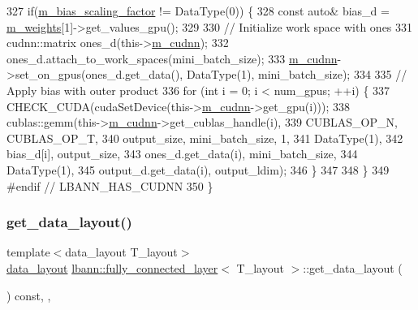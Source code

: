 \begin{DoxyCode}
327     \textcolor{keywordflow}{if}(\hyperlink{classlbann_1_1fully__connected__layer_ae02eaffd5528bf572883f8b06d1b40c0}{m\_bias\_scaling\_factor} != DataType(0)) \{
328       \textcolor{keyword}{const} \textcolor{keyword}{auto}& bias\_d = \hyperlink{classlbann_1_1Layer_a7954e30fbf9100a6ba4b56d02767a469}{m\_weights}[1]->get\_values\_gpu();
329       
330       \textcolor{comment}{// Initialize work space with ones}
331       cudnn::matrix ones\_d(this->\hyperlink{classlbann_1_1Layer_a08dbb94239e3b8c96329786c57c72e21}{m\_cudnn});
332       ones\_d.attach\_to\_work\_spaces(mini\_batch\_size);
333       \hyperlink{classlbann_1_1Layer_a08dbb94239e3b8c96329786c57c72e21}{m\_cudnn}->set\_on\_gpus(ones\_d.get\_data(), DataType(1), mini\_batch\_size);
334 
335       \textcolor{comment}{// Apply bias with outer product}
336       \textcolor{keywordflow}{for} (\textcolor{keywordtype}{int} i = 0; i < num\_gpus; ++i) \{
337         CHECK\_CUDA(cudaSetDevice(this->\hyperlink{classlbann_1_1Layer_a08dbb94239e3b8c96329786c57c72e21}{m\_cudnn}->get\_gpu(i)));
338         cublas::gemm(this->\hyperlink{classlbann_1_1Layer_a08dbb94239e3b8c96329786c57c72e21}{m\_cudnn}->get\_cublas\_handle(i),
339                      CUBLAS\_OP\_N, CUBLAS\_OP\_T,
340                      output\_size, mini\_batch\_size, 1,
341                      DataType(1),
342                      bias\_d[i], output\_size,
343                      ones\_d.get\_data(i), mini\_batch\_size,
344                      DataType(1),
345                      output\_d.get\_data(i), output\_ldim);
346       \}
347 
348     \}
349 \textcolor{preprocessor}{#endif // LBANN\_HAS\_CUDNN}
350   \}
\end{DoxyCode}
\mbox{\label{classlbann_1_1fully__connected__layer_a0d84bbfa7df80e879da13f54d465a603}} 
\subsubsection{\texorpdfstring{get\+\_\+data\+\_\+layout()}{get\_data\_layout()}}
{\footnotesize\ttfamily template$<$data\+\_\+layout T\+\_\+layout$>$ \\
\hyperlink{base_8hpp_a786677cbfb3f5677b4d84f3056eb08db}{data\+\_\+layout} \hyperlink{classlbann_1_1fully__connected__layer}{lbann\+::fully\+\_\+connected\+\_\+layer}$<$ T\+\_\+layout $>$\+::get\+\_\+data\+\_\+layout (\begin{DoxyParamCaption}{ }\end{DoxyParamCaption}) const\hspace{0.3cm}{\ttfamily [inline]}, {\ttfamily [override]}, {\ttfamily [virtual]}}

